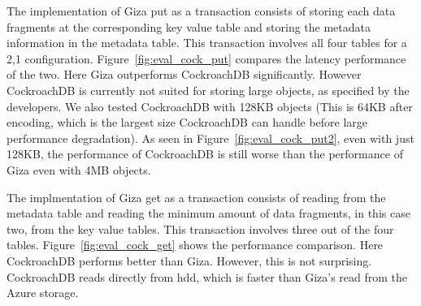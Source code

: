 The implementation of Giza put as a transaction consists of storing each data fragments at the corresponding key value table and storing the metadata information in the metadata table. This transaction involves all four tables for a 2,1 configuration. Figure~\ref{fig:eval_cock_put} compares the latency performance of the two. Here Giza outperforms CockroachDB significantly.
However CockroachDB is currently not suited for storing large objects, as specified by the developers. We also tested CockroachDB with 128KB objects (This is 64KB after encoding, which is the largest size CockroachDB can handle before large performance degradation). As seen in Figure~\ref{fig:eval_cock_put2}, even with just 128KB, the performance of CockroachDB is still worse than the performance of Giza even with 4MB objects.

The implmentation of Giza get as a transaction consists of reading from the metadata table and reading the minimum amount of data fragments, in this case two, from the key value tables. This transaction involves three out of the four tables. Figure~\ref{fig:eval_cock_get} shows the performance comparison. Here CockroachDB performs better than Giza. However, this is not surprising. CockroachDB reads directly from hdd, which is faster than Giza's read from the Azure storage.




